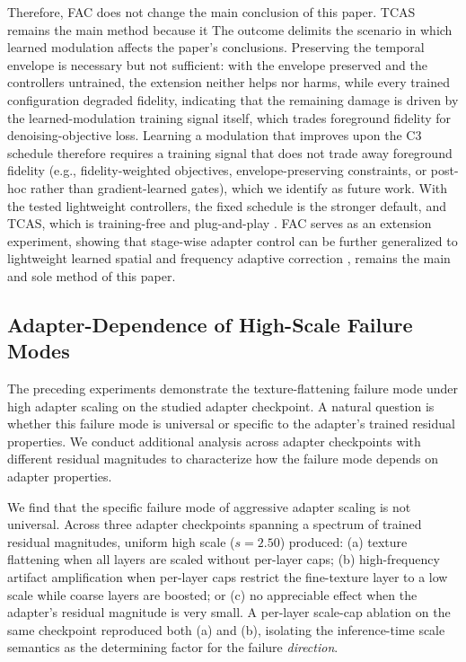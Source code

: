 \documentclass[times,twocolumn,final]{elsarticle}
\providecommand{\DIFadd}[1]{{\protect\color{red} \sf #1}} %
\providecommand{\DIFdel}[1]{{\protect\color{red} \scriptsize #1}} %
\providecommand{\DIFaddbegin}{} %
\providecommand{\DIFaddend}{} %
\providecommand{\DIFdelbegin}{} %
\providecommand{\DIFdelend}{} %
\newcommand{\DIFscaledelfig}{0.5}
\newlength{\DIFdelgraphicswidth} %
\newlength{\DIFdelgraphicsheight} %
\newcommand{\DIFaddincludegraphics}[2][]{{\color{red}\fbox{\DIFOincludegraphics[#1]{#2}}}} %
\newcommand{\DIFdelincludegraphics}[2][]{%
\sbox{\DIFdelgraphicsbox}{\DIFOincludegraphics[#1]{#2}}%
\settoboxwidth{\DIFdelgraphicswidth}{\DIFdelgraphicsbox} %
\settoboxtotalheight{\DIFdelgraphicsheight}{\DIFdelgraphicsbox} %
\scalebox{\DIFscaledelfig}{%
\parbox[b]{\DIFdelgraphicswidth}{\usebox{\DIFdelgraphicsbox}\\[-\baselineskip] \rule{\DIFdelgraphicswidth}{0em}}\llap{\resizebox{\DIFdelgraphicswidth}{\DIFdelgraphicsheight}{%
\setlength{\unitlength}{\DIFdelgraphicswidth}%
\begin{picture}(1,1)%
\thicklines\linethickness{2pt} %
{\color[rgb]{1,0,0}\put(0,0){\framebox(1,1){}}}%
{\color[rgb]{1,0,0}\put(0,0){\line( 1,1){1}}}%
{\color[rgb]{1,0,0}\put(0,1){\line(1,-1){1}}}%
\end{picture}%
}\hspace*{3pt}}} %
} %
\DeclareRobustCommand{\DIFaddbegin}{\DIFOaddbegin \let\includegraphics\DIFaddincludegraphics} %
\DeclareRobustCommand{\DIFaddend}{\DIFOaddend \let\includegraphics\DIFOincludegraphics} %
\DeclareRobustCommand{\DIFdelbegin}{\DIFOdelbegin \let\includegraphics\DIFdelincludegraphics} %
\DeclareRobustCommand{\DIFdelend}{\DIFOaddend \let\includegraphics\DIFOincludegraphics} %
\begin{document}
\DIFdelbegin \DIFdel{Therefore, FAC does not change the main conclusion of this paper. TCAS remains the main method because it }\DIFdelend \DIFaddbegin \DIFadd{The outcome delimits the scenario in which learned modulation affects the paper's conclusions. Preserving the temporal envelope is necessary but not sufficient: with the envelope preserved and the controllers untrained, the extension neither helps nor harms, while every trained configuration degraded fidelity, indicating that the remaining damage is driven by the learned-modulation training signal itself, which trades foreground fidelity for denoising-objective loss. Learning a modulation that improves upon the C3 schedule therefore requires a training signal that does not trade away foreground fidelity (e.g., fidelity-weighted objectives, envelope-preserving constraints, or post-hoc rather than gradient-learned gates), which we identify as future work. With the tested lightweight controllers, the fixed schedule is the stronger default, and TCAS, which }\DIFaddend is training-free and plug-and-play\DIFdelbegin \DIFdel{. FAC serves as an extension experiment, showing that stage-wise adapter control can be further generalized to lightweight learned spatial and frequency adaptive correction}\DIFdelend \DIFaddbegin \DIFadd{, remains the main and sole method of this paper}\DIFaddend .

\FloatBarrier

\subsection{Adapter-Dependence of High-Scale Failure Modes}
\label{subsec:adapterdep}

The preceding experiments demonstrate the texture-flattening failure mode under high adapter scaling on the studied adapter checkpoint. A natural question is whether this failure mode is universal or specific to the adapter's trained residual properties. We conduct additional analysis across adapter checkpoints with different residual magnitudes to characterize how the failure mode depends on adapter properties.

We find that the specific failure mode of aggressive adapter scaling is not universal. Across three adapter checkpoints spanning a spectrum of trained residual magnitudes, uniform high scale ($s = 2.50$) produced: (a) texture flattening when all layers are scaled without per-layer caps; (b) high-frequency artifact amplification when per-layer caps restrict the fine-texture layer to a low scale while coarse layers are boosted; or (c) no appreciable effect when the adapter's residual magnitude is very small. A per-layer scale-cap ablation on the same checkpoint reproduced both (a) and (b), isolating the inference-time scale semantics as the determining factor for the failure \emph{direction}.
\end{document}
